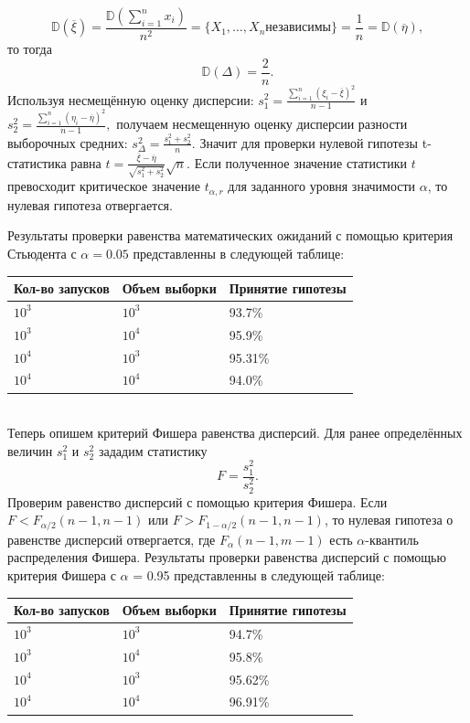 \documentclass[11pt]{article}
\numberwithin{equation}{section}
\begin{document}
$$\mathbb{D}(\overline{\xi}) = \frac{\mathbb{D}(\sum_{i=1}^n x_i)}{n^2} = \{ X_1, \dots, X_n \text{независимы}\} = \frac{1}{n} = \mathbb{D}(\overline{\eta}),$$
то тогда  
$$ \mathbb{D}(\Delta) = \frac{2}{n}.$$
Используя несмещённую оценку дисперсии: $s_1^2= \frac{\sum_{i=1}^{n}(\xi_i-\overline{\xi})^2}{n-1}$ и 
$s_2^2= \frac{\sum_{i=1}^{n}(\eta_i-\overline{\eta})^2}{n-1},$
получаем несмещенную оценку дисперсии разности выборочных средних: $s_{\Delta}^2 = \frac{s_1^2+s_2^2}{n}.$
Значит для проверки нулевой гипотезы t-статистика равна $t=\frac{\overline{\xi}-\overline{\eta}}{\sqrt{s_1^2+s_2^2}} \sqrt{n}.$
Если полученное значение статистики $t$ превосходит критическое значение $t_{\alpha,r}$ для заданного уровня значимости $\alpha$, то нулевая гипотеза отвергается.


Результаты проверки равенства математических ожиданий с помощью критерия Стьюдента с $\alpha = 0.05$ представленны в следующей таблице:
\\
\begin{tabular}{ | l | l | l | }
  \hline
  Кол-во запусков & Объем выборки & Принятие гипотезы\\ \hline
  $10^3$ & $10^3$ & 93.7\% \\ \hline
  $10^3$ & $10^4$ & 95.9\%  \\ \hline
  $10^4$ & $10^3$ & 95.31\% \\ \hline
  $10^4$ & $10^4$ & 94.0\% \\ \hline
  \hline
\end{tabular}
\\


Теперь опишем критерий Фишера равенства дисперсий. Для ранее определённых величин $s_1^2$ и $s_2^2$ зададим статистику
$$ F =\frac{s_1^2}{s_2^2}.$$
Проверим равенство дисперсий с помощью критерия Фишера.
Если $F < F_{\alpha/2}(n−1,n−1)$ или $F > F_{1−\alpha/2}(n − 1, n − 1)$, то нулевая гипотеза о равенстве дисперсий отвергается, где $F_{\alpha}(n − 1, m − 1)$ есть $\alpha$-квантиль распределения Фишера.
Результаты проверки равенства дисперсий с помощью критерия Фишера с $\alpha$ = 0.95 представленны в следующей таблице:
\\
\begin{tabular}{ | l | l | l | }
  \hline
  Кол-во запусков & Объем выборки & Принятие гипотезы\\ \hline
  $10^3$ & $10^3$ & 94.7\% \\ \hline
  $10^3$ & $10^4$ & 95.8\%  \\ \hline
  $10^4$ & $10^3$ & 95.62\% \\ \hline
  $10^4$ & $10^4$ & 96.91\% \\ \hline
  \hline
\end{tabular}
\\
\end{document}
